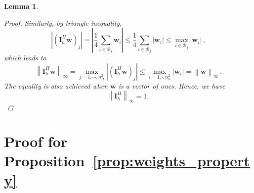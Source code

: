 \documentclass{article}
\numberwithin{equation}{section}
\newtheorem{lemma}[theorem]{Lemma}     %
\begin{document}
\begin{lemma}
\begin{proof}
    Similarly, by triangle inequality,
    \begin{equation*}
         \left|\left(\bm{I}_h^H\bm{w}\right)_j\right| = \left|\frac{1}{4}\sum_{i\in\mathcal{B}_j}\bm{w}_i\right|\leq \frac{1}{4}\sum_{i\in\mathcal{B}_j}|\bm{w}_i|\leq\max_{i\in\mathcal{B}_j}|\bm{w}_i|\,,
    \end{equation*}  
    which leads to
    \begin{equation*}
        \left\|\bm{I}_h^H\bm{w}\right\|_\infty = \max_{j=1,\cdots,n_H^2}\left|\left(\bm{I}_h^H\bm{w}\right)_j\right|
        \leq \max_{i=1,\cdot,n_h^2}|\bm{w}_i|
        = \left\|\bm{w}\right\|_\infty\,.
    \end{equation*}
    The equality is also achieved when $\bm{w}$ is a vector of ones.  Hence, we have
    \begin{equation*}
        \left\|\bm{I}_h^H\right\|_\infty=1\,.
    \end{equation*}
    \end{proof}
\end{lemma}

\section{Proof for Proposition~\ref{prop:weights_property}}\label{app:proof_weights_property}
\end{document}
